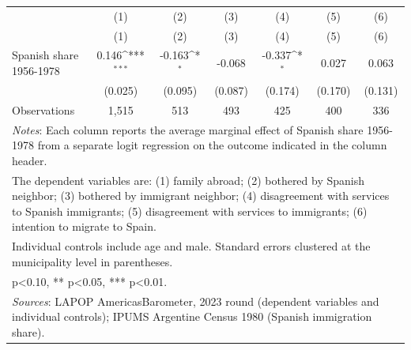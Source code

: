 {
\def\sym#1{\ifmmode^{#1}\else\(^{#1}\)\fi}
\begin{tabular}{l*{6}{c}}
\toprule
            &\multicolumn{1}{c}{(1)}&\multicolumn{1}{c}{(2)}&\multicolumn{1}{c}{(3)}&\multicolumn{1}{c}{(4)}&\multicolumn{1}{c}{(5)}&\multicolumn{1}{c}{(6)}\\
            &\multicolumn{1}{c}{(1)}&\multicolumn{1}{c}{(2)}&\multicolumn{1}{c}{(3)}&\multicolumn{1}{c}{(4)}&\multicolumn{1}{c}{(5)}&\multicolumn{1}{c}{(6)}\\
\midrule
Spanish share 1956-1978&       0.146\sym{***}&      -0.163\sym{*}  &      -0.068         &      -0.337\sym{*}  &       0.027         &       0.063         \\
            &     (0.025)         &     (0.095)         &     (0.087)         &     (0.174)         &     (0.170)         &     (0.131)         \\
\midrule
Observations&       1,515         &         513         &         493         &         425         &         400         &         336         \\
\bottomrule
\multicolumn{7}{l}{\footnotesize \textit{Notes}: Each column reports the average marginal effect of Spanish share 1956-1978 from a separate logit regression on the outcome indicated in the column header.}\\
\multicolumn{7}{l}{\footnotesize The dependent variables are: (1) family abroad; (2) bothered by Spanish neighbor; (3) bothered by immigrant neighbor; (4) disagreement with services to Spanish immigrants; (5) disagreement with services to immigrants; (6) intention to migrate to Spain.}\\
\multicolumn{7}{l}{\footnotesize Individual controls include age and male. Standard errors clustered at the municipality level in parentheses.}\\
\multicolumn{7}{l}{\footnotesize * p<0.10, ** p<0.05, *** p<0.01.}\\
\multicolumn{7}{l}{\footnotesize \textit{Sources}: LAPOP AmericasBarometer, 2023 round (dependent variables and individual controls); IPUMS Argentine Census 1980 (Spanish immigration share).}\\
\end{tabular}
}
